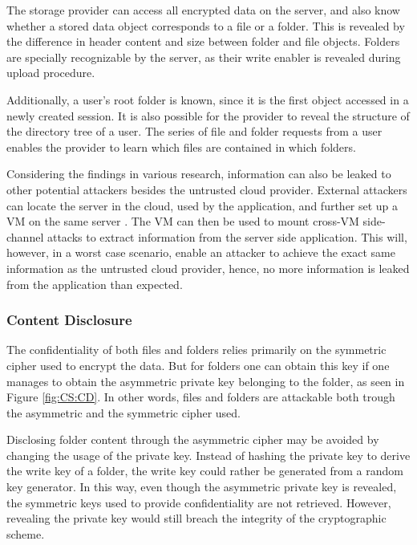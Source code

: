 \documentclass[pdftex,english,10pt,b5paper,twoside]{book}
\begin{document}
The storage provider can access all encrypted data on the server, and also know
whether a stored data object corresponds to a file or a folder. This is
revealed by the difference in header content and size between folder and file
objects. Folders are specially recognizable by the server, as their write
enabler is revealed during upload procedure. 

Additionally, a user's root folder is known, since it is the first object
accessed in a newly created session. It is also possible for the provider to
reveal the structure of the directory tree of a user. The series of file and
folder requests from a user enables the provider to learn which files are
contained in which folders.

Considering the findings in various research, information can also be leaked to
other potential attackers besides the untrusted cloud provider. External
attackers can locate the server in the cloud, used by the application, and
further set up a \ac{VM} on the same server \cite{cloud_getoff}. The \ac{VM}
can then be used to mount cross-\ac{VM} side-channel attacks to extract
information from the server side application. This will, however, in a worst
case scenario, enable an attacker to achieve the exact same information as the
untrusted cloud provider, hence, no more information is leaked from the
application than expected.

\subsubsection{Content Disclosure}

The confidentiality of both files and folders relies primarily on the symmetric
cipher used to encrypt the data. But for folders one can obtain this key if one
manages to obtain the asymmetric private key belonging to the folder, as seen
in Figure \ref{fig:CS:CD}. In other words, files and folders are attackable
both trough the asymmetric and the symmetric cipher used.

Disclosing folder content through the asymmetric cipher may be avoided by
changing the usage of the private key. Instead of hashing the private key to
derive the write key of a folder, the write key could rather be generated from
a random key generator. In this way, even though the asymmetric private key is
revealed, the symmetric keys used to provide confidentiality are not retrieved.
However, revealing the private key would still breach the integrity of the
cryptographic scheme.
\end{document}
